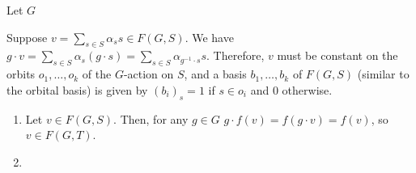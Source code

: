 \documentclass{article}
\begin{document}
	\begin{problem}
		Let $G$
	\end{problem}
	\begin{solution*}
		Suppose $v = \sum_{s \in S} \alpha_s s \in F(G,S)$. We have $g \cdot v = \sum_{s \in S} \alpha_s (g \cdot s) = \sum_{s \in S} \alpha_{g^{-1} \cdot s} s$. Therefore, $v$ must be constant on the orbits $o_1,\ldots,o_k$ of the $G$-action on $S$, and a basis $b_1,\ldots,b_k$ of $F(G,S)$ (similar to the orbital basis) is given by $(b_i)_s = 1$ if $s \in o_i$ and $0$ otherwise.
		\begin{enumerate}[label=(\roman*)]
			\item Let $v \in F(G,S)$. Then, for any $g \in G$ $g \cdot f(v) = f(g \cdot v) = f(v)$, so $v \in F(G,T)$.
			\item 
		\end{enumerate}
	\end{solution*}
\end{document}
